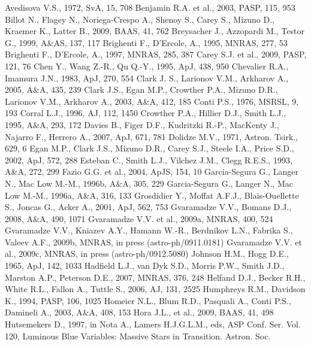 \documentclass[useAMS]{mn2e}
\begin{document}
\begin{thebibliography}{}
%
\bibitem{} Avedisova V.S., 1972, SvA, 15, 708
\bibitem{} Benjamin R.A. et al., 2003, PASP, 115, 953
\bibitem{} Billot N., Flagey N., Noriega-Crespo A., Shenoy S., Carey S., Mizuno D., Kraemer K., Latter B., 2009, BAAS, 41, 762
\bibitem{} Breysacher J., Azzopardi M., Testor G., 1999, A\&AS, 137, 117
\bibitem{} Brighenti F., D'Ercole, A., 1995, MNRAS, 277, 53
\bibitem{} Brighenti F., D'Ercole, A., 1997, MNRAS, 285, 387
\bibitem{} Carey S.J. et al., 2009, PASP, 121, 76
\bibitem{} Chen Y., Wang Z.-R., Qu Q.-Y., 1995, ApJ, 438, 950
\bibitem{} Chevalier R.A., Imamura J.N., 1983, ApJ, 270, 554
\bibitem{} Clark J. S., Larionov V.M., Arkharov A., 2005, A\&A, 435, 239
\bibitem{} Clark J.S., Egan M.P., Crowther P.A., Mizuno D.R., Larionov V.M., Arkharov A., 2003, A\&A, 412, 185
\bibitem{} Conti P.S., 1976, MSRSL, 9, 193
\bibitem{} Corral L.J., 1996, AJ, 112, 1450
\bibitem{} Crowther P.A., Hillier D.J., Smith L.J., 1995, A\&A, 293, 172
\bibitem{} Davies B., Figer D.F., Kudritzki R.-P., MacKenty J., Najarro F., Herrero A., 2007, ApJ, 671, 781
\bibitem{} Dolidze M.V., 1971, Astron. Tsirk., 629, 6
\bibitem{} Egan M.P., Clark J.S., Mizuno D.R., Carey S.J., Steele I.A., Price S.D., 2002, ApJ, 572, 288
\bibitem{} Esteban C., Smith L.J., Vilchez J.M., Clegg R.E.S., 1993, A\&A, 272, 299
\bibitem{} Fazio G.G. et al., 2004, ApJS, 154, 10
\bibitem{} Garcia-Segura G., Langer N., Mac Low M.-M., 1996b, A\&A, 305, 229
\bibitem{} Garcia-Segura G., Langer N., Mac Low M.-M., 1996a, A\&A, 316, 133
\bibitem{} Grosdidier Y., Moffat A.F.J., Blais-Ouellette S., Joncas G., Acker A., 2001, ApJ, 562, 753
\bibitem{} Gvaramadze V.V., Bomans D.J., 2008, A\&A, 490, 1071
\bibitem{} Gvaramadze V.V. et al., 2009a, MNRAS, 400, 524
\bibitem{} Gvaramadze V.V., Kniazev A.Y., Hamann W.-R., Berdnikov L.N., Fabrika S., Valeev A.F., 2009b, MNRAS,
in press (astro-ph/0911.0181)
\bibitem{} Gvaramadze V.V. et al., 2009c, MNRAS, in press (astro-ph/0912.5080)
\bibitem{} Johnson H.M., Hogg D.E., 1965, ApJ, 142, 1033
\bibitem{} Hadfield L.J., van Dyk S.D., Morris P.W., Smith J.D., Marston A.P., Peterson
D.E., 2007, MNRAS, 376, 248
\bibitem{} Helfand D.J., Becker R.H., White R.L., Fallon A., Tuttle S., 2006, AJ, 131, 2525
\bibitem{} Humphreys R.M., Davidson K., 1994, PASP, 106, 1025
\bibitem{} Homeier N.L., Blum R.D., Pasquali A., Conti P.S., Damineli A., 2003, A\&A, 408, 153
\bibitem{} Hora J.L., et al., 2009, BAAS, 41, 498
\bibitem{} Hutsemekers D., 1997, in Nota  A., Lamers  H.J.G.L.M., eds, ASP Conf. Ser. Vol. 120,
Luminous Blue Variables: Massive Stars in Transition. Astron. Soc.

\end{thebibliography}
\end{document}

